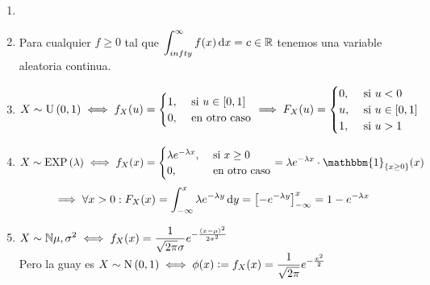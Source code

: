 \begin{ejem}
	\begin{enumerate}
		\item[]
		\item Para cualquier $f\geq 0$ tal que $\ds \int_{\-infty}^{\infty} f(x) \odif{x} = c \in \R$ tenemos una variable aleatoria continua.
		\item $\displaystyle X\sim\operatorname{U}\left(0,1\right) \iff f_X(u)=\begin{cases}
				      1, & \text{ si } u\in[0,1] \\
				      0, & \text{ en otro caso}
			      \end{cases} \implies F_X(u) = \begin{cases}
				      0, & \text{ si } u<0       \\
				      u, & \text{ si } u\in[0,1] \\
				      1, & \text{ si } u>1
			      \end{cases}$
		\item $\ds X\sim\EXP{\lambda} \iff f_X(x) = \begin{cases}
				      \lambda e^{-\lambda x}, & \text{ si } x\geq 0  \\
				      0,                      & \text{ en otro caso}
			      \end{cases} = \lambda e^{-\lambda x} \cdot \mathbbm{1}_{\{x\geq 0\}}(x)$
		      \[\implies \forall x > 0 : F_X(x) = \int_{-\infty}^{x} \lambda e^{-\lambda y} \odif{y} = \left[-e^{-\lambda y}\right]_{-\infty}^{x} = 1-e^{-\lambda x}\]
		\item $\displaystyle X\sim\mathbb{N}{\mu, \sigma^2} \iff f_X(x) = \frac{1}{\sqrt{2\pi}\sigma} e^{-\frac{(x-\mu)^2}{2\sigma^2}}$ \\
		Pero la guay es $\displaystyle X\sim\operatorname{N}\left(0, 1\right) \iff \phi(x) \vcentcolon= f_X(x) = \frac{1}{\sqrt{2\pi}} e^{-\frac{x^2}{2}}$
	\end{enumerate}
\end{ejem}